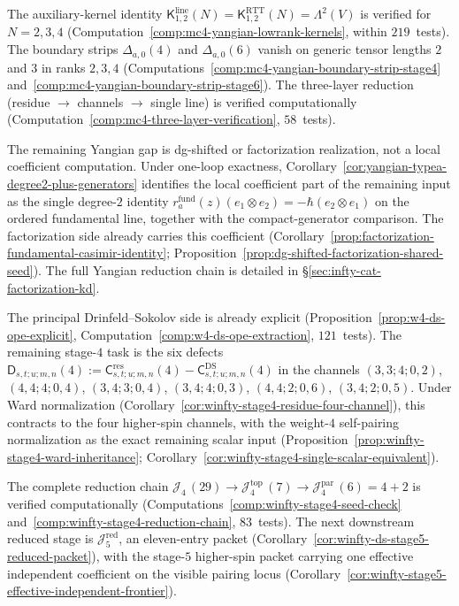 \begin{remark}
\label{rem:mc4-yangian-computation-target}
The auxiliary-kernel identity
$\mathsf{K}^{\mathrm{line}}_{1,2}(N)
= \mathsf{K}^{\mathrm{RTT}}_{1,2}(N) = \Lambda^2(V)$ is verified
for $N = 2, 3, 4$ (Computation~\ref{comp:mc4-yangian-lowrank-kernels},
within $219$~tests). The boundary strips $\Delta_{a,0}(4)$ and
$\Delta_{a,0}(6)$ vanish on generic tensor lengths $2$ and $3$ in
ranks $2,3,4$
(Computations~\ref{comp:mc4-yangian-boundary-strip-stage4}
and~\ref{comp:mc4-yangian-boundary-strip-stage6}).
The three-layer reduction (residue $\to$ channels $\to$ single line)
is verified computationally
(Computation~\ref{comp:mc4-three-layer-verification}, $58$~tests).

The remaining Yangian gap is dg-shifted or factorization realization, not
a local coefficient computation. Under one-loop exactness,
Corollary~\ref{cor:yangian-typea-degree2-plus-generators} identifies
the local coefficient part of the remaining input as the single
degree-$2$ identity
$r_a^{\mathrm{fund}}(z)(e_1\otimes e_2) = -\hbar(e_2\otimes e_1)$
on the ordered fundamental line, together with the compact-generator
comparison. The factorization side already
carries this coefficient
(Corollary~\ref{prop:factorization-fundamental-casimir-identity};
Proposition~\ref{prop:dg-shifted-factorization-shared-seed}). The
full Yangian reduction chain is detailed in
\S\ref{sec:infty-cat-factorization-kd}.
\end{remark}

\begin{remark}\label{rem:mc4-winfty-computation-target}
The principal Drinfeld--Sokolov side is already explicit
(Proposition~\ref{prop:w4-ds-ope-explicit},
Computation~\ref{comp:w4-ds-ope-extraction}, $121$~tests). The remaining
stage-$4$ task is the six defects
$\mathsf{D}_{s,t;u;m,n}(4)
:= \mathsf{C}^{\mathrm{res}}_{s,t;u;m,n}(4)
- \mathsf{C}^{\mathrm{DS}}_{s,t;u;m,n}(4)$
in the channels $(3,3;4;0,2)$, $(4,4;4;0,4)$, $(3,4;3;0,4)$,
$(3,4;4;0,3)$, $(4,4;2;0,6)$, $(3,4;2;0,5)$.
Under Ward normalization
(Corollary~\ref{cor:winfty-stage4-residue-four-channel}), this
contracts to the four higher-spin channels, with the
weight-$4$ self-pairing normalization as the exact remaining scalar
input (Proposition~\ref{prop:winfty-stage4-ward-inheritance};
Corollary~\ref{cor:winfty-stage4-single-scalar-equivalent}).

The complete reduction chain
$\mathcal{J}_4\,(29) \to \mathcal{J}_4^{\mathrm{top}}\,(7)
\to \mathcal{J}_4^{\mathrm{par}}\,(6) = 4 + 2$
is verified computationally
(Computations~\ref{comp:winfty-stage4-seed-check}
and~\ref{comp:winfty-stage4-reduction-chain}, $83$~tests). The next downstream reduced stage is $\mathcal{J}_5^{\mathrm{red}}$, an
eleven-entry packet
(Corollary~\ref{cor:winfty-ds-stage5-reduced-packet}), with the
stage-$5$ higher-spin packet carrying one effective independent
coefficient on the visible pairing locus
(Corollary~\ref{cor:winfty-stage5-effective-independent-frontier}).
\end{remark}

